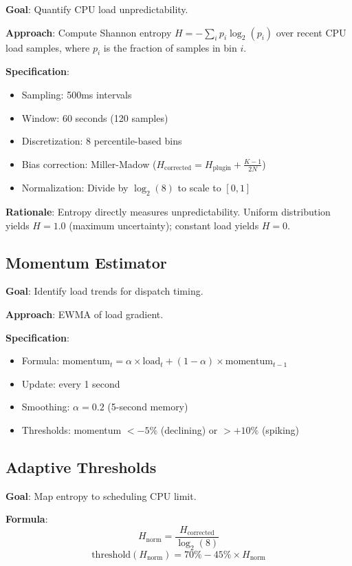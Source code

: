 \documentclass[11pt,letterpaper]{article}
\begin{document}
\textbf{Goal}: Quantify CPU load unpredictability.

\textbf{Approach}: Compute Shannon entropy $H = -\sum_{i} p_i \log_2(p_i)$ over recent CPU load samples, where $p_i$ is the fraction of samples in bin $i$.

\textbf{Specification}:
\begin{itemize}
  \item Sampling: 500ms intervals
  \item Window: 60 seconds (120 samples)
  \item Discretization: 8 percentile-based bins
  \item Bias correction: Miller-Madow ($H_{\text{corrected}} = H_{\text{plugin}} + \frac{K-1}{2N}$)
  \item Normalization: Divide by $\log_2(8)$ to scale to $[0, 1]$
\end{itemize}

\textbf{Rationale}: Entropy directly measures unpredictability. Uniform distribution yields $H=1.0$ (maximum uncertainty); constant load yields $H=0$.

\subsection{Momentum Estimator}

\textbf{Goal}: Identify load trends for dispatch timing.

\textbf{Approach}: EWMA of load gradient.

\textbf{Specification}:
\begin{itemize}
  \item Formula: $\text{momentum}_t = \alpha \times \text{load}_t + (1 - \alpha) \times \text{momentum}_{t-1}$
  \item Update: every 1 second
  \item Smoothing: $\alpha = 0.2$ (5-second memory)
  \item Thresholds: momentum $< -5\%$ (declining) or $> +10\%$ (spiking)
\end{itemize}

\subsection{Adaptive Thresholds}

\textbf{Goal}: Map entropy to scheduling CPU limit.

\textbf{Formula}:
\begin{equation}
H_{\text{norm}} = \frac{H_{\text{corrected}}}{\log_2(8)}
\end{equation}
\begin{equation}
\text{threshold}(H_{\text{norm}}) = 70\% - 45\% \times H_{\text{norm}}
\end{equation}
\end{document}
